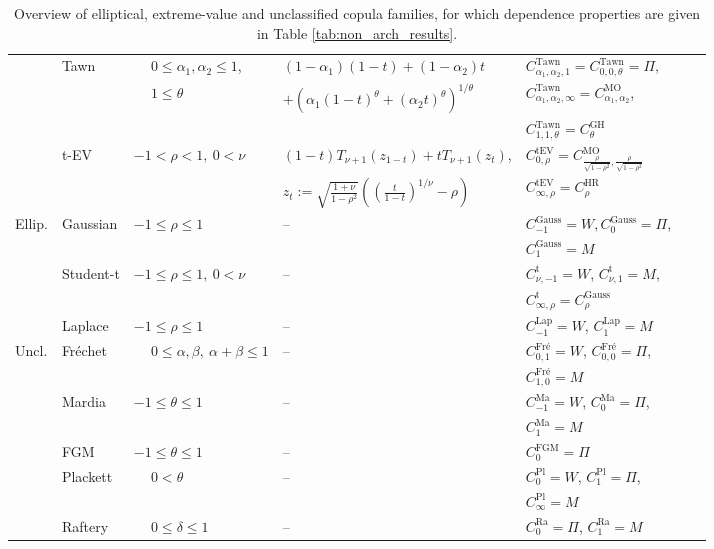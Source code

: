 \documentclass{article}
\def\of#1{\left(#1\right)} %
\def\inbrackets#1{\of{#1}} %
\begin{document}
\begin{table}[b!]
\begin{center}
{\begin{tabular}{lllllcc}
            & Tawn & $\phantom{-}0\leq\alpha_1,\alpha_2\leq1$, & $(1-\alpha_1)(1-t) + (1-\alpha_2)t $ & $C^{\text{Tawn}}_{\alpha_1, \alpha_2, 1} = C^{\text{Tawn}}_{0, 0, \theta} =\Pi$, \\
            & & $\phantom{-}1\leq\theta$ & $ + \inbrackets{\alpha_1(1-t)^{\theta} + (\alpha_2 t)^\theta}^{1/\theta}$ & $C^{\text{Tawn}}_{\alpha_1, \alpha_2, \infty} = C^{\text{MO}}_{\alpha_1, \alpha_2}$, \\
            & & & & $C^{\text{Tawn}}_{1, 1, \theta} = C^{\text{GH}}_{\theta}$ \\
            & t-EV & $-1<\rho<1,~0<\nu$ & $(1-t)T_{\nu + 1}(z_{1-t}) + t T_{\nu + 1}(z_t)$, & $C^{\text{tEV}}_{0, \rho} = C^{\text{MO}}_{\frac{\rho}{\sqrt{1-\rho^2}}, \frac{\rho}{\sqrt{1-\rho^2}}}$ \\
            & & & $z_t := \sqrt{\frac{1+\nu}{1-\rho^2}}\inbrackets{\of{\frac{t}{1-t}}^{1/\nu}-\rho}$ & $C^{\text{tEV}}_{\infty, \rho} = C^{\text{HR}}_{\rho}$ \\
            \midrule
            Ellip. & Gaussian & $-1 \leq \rho \leq 1$ & -- & $C^{\text{Gauss}}_{-1} = W, C^{\text{Gauss}}_{0} = \Pi$, \\
            & & & & $C^{\text{Gauss}}_{1}=M$ \\
            & Student-t & $-1 \leq \rho \leq 1,~0<\nu$ & -- & $C^{\text{t}}_{\nu, -1} = W$, $C^{\text{t}}_{\nu,1}=M$, \\
            & & & &  $C^{\text{t}}_{\infty,\rho} = C^{\text{Gauss}}_\rho$ \\
            & Laplace & $-1 \leq \rho \leq 1$ & -- & $C^{\text{Lap}}_{-1} = W$, $C^{\text{Lap}}_{1}=M$ \\
            \midrule
            Uncl. & Fréchet & $\phantom{-}0\leq\alpha,\beta,~\alpha+\beta \leq 1$ & -- & $C^{\text{Fré}}_{0, 1}=W$, $C^{\text{Fré}}_{0,0} = \Pi$, \\
            & & & & $C^{\text{Fré}}_{1, 0}=M$ \\
            & Mardia & $-1 \leq \theta \leq 1$ & -- & $C^{\text{Ma}}_{-1}=W$, $C^{\text{Ma}}_{0}=\Pi$, \\
            & & & & $C^{\text{Ma}}_{1}=M$ \\
            & FGM & $-1 \leq \theta \leq 1$ & -- & $C^{\text{FGM}}_0=\Pi$ \\
            & Plackett & $\phantom{-}0<\theta$ & -- & $C^{\text{Pl}}_0=W$, $C^{\text{Pl}}_1=\Pi$, \\
            & & &  & $C^{\text{Pl}}_{\infty}=M$ \\
            & Raftery & $\phantom{-}0 \leq \delta \leq 1$ & -- & $C^{\text{Ra}}_{0} = \Pi$, $C^{\text{Ra}}_{1} = M$ \\
            \bottomrule
        \end{tabular}
        }
    \end{center}
    \caption{
        Overview of elliptical, extreme-value and unclassified copula families, for which dependence properties are given in Table \ref{tab:non_arch_results}.
    }
    \label{tab:non_arch_overview}
\end{table}
 
\end{document}
